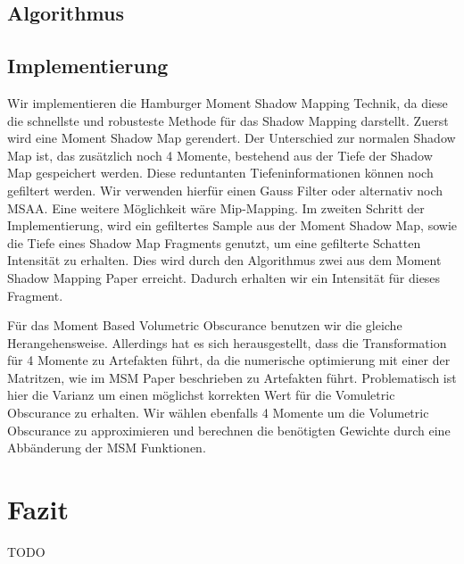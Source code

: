 \documentclass[runningheaders,a4paper]{llncs}
\begin{document}
\subsection{Algorithmus}

\subsection{Implementierung}
Wir implementieren die Hamburger Moment Shadow Mapping Technik, da diese die schnellste und robusteste Methode für das Shadow Mapping darstellt.\cite{msm} Zuerst wird eine Moment Shadow Map gerendert. Der Unterschied zur normalen Shadow Map ist, das zusätzlich noch 4 Momente, bestehend aus der Tiefe der Shadow Map gespeichert werden. Diese reduntanten Tiefeninformationen können noch gefiltert werden. Wir verwenden hierfür einen Gauss Filter oder alternativ noch MSAA. Eine weitere Möglichkeit wäre Mip-Mapping.
Im zweiten Schritt der Implementierung, wird ein gefiltertes Sample aus der Moment Shadow Map, sowie die Tiefe eines Shadow Map Fragments genutzt, um eine gefilterte Schatten Intensität zu erhalten. Dies wird durch den Algorithmus zwei aus dem Moment Shadow Mapping Paper erreicht.\cite{msm}
Dadurch erhalten wir ein Intensität für dieses Fragment.

Für das Moment Based Volumetric Obscurance benutzen wir die gleiche Herangehensweise. Allerdings hat es sich herausgestellt, dass die Transformation für 4 Momente zu Artefakten führt, da die numerische optimierung mit einer der Matritzen, wie im MSM Paper beschrieben zu Artefakten führt. Problematisch ist hier die Varianz um einen möglichst korrekten Wert für die Vomuletric Obscurance zu erhalten.
Wir wählen ebenfalls 4 Momente um die Volumetric Obscurance zu approximieren und berechnen die benötigten Gewichte durch eine Abbänderung der MSM Funktionen.



	


\section{Fazit}

	TODO



\end{document}
